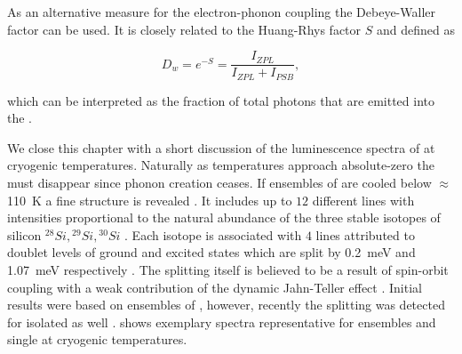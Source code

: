    As an alternative measure for the electron-phonon coupling the Debeye-Waller factor can be used. It is closely related to the Huang-Rhys factor $S$ and defined as

   \begin{equation}
     D_w = e^{-S} = \frac{I_{ZPL}}{I_{ZPL} + I_{PSB}},
   \end{equation}

    which can be interpreted as the fraction of total photons that are emitted into the \zpl.

    We close this chapter with a short discussion of the luminescence spectra of \sivs at cryogenic temperatures. Naturally as temperatures approach absolute-zero the \psb must disappear since phonon creation ceases. If ensembles of \sivs are cooled below $\approx$ \SI{110}{\kelvin} a fine structure is revealed \cite{neu2013low}. It includes up to $12$ different lines with intensities proportional to the natural abundance of the three stable isotopes of silicon ${}^{28}Si, {}^{29}Si, {}^{30}Si$ \cite{Clark1995}. Each isotope is associated with $4$ lines attributed to doublet levels of ground and excited states which are split by \SI{0.2}{\milli\eV} and \SI{1.07}{\milli\eV} respectively \cite{Rogers2014, Hepp2014, Clark1995}. The splitting itself is believed to be a result of spin-orbit coupling with a weak contribution of the dynamic Jahn-Teller effect \cite{Hepp2014}. Initial results were based on ensembles of \sivs, however, recently the splitting was detected for isolated \sivs as well \cite{Dietrich2014}.  shows exemplary spectra representative for ensembles and single \siv at cryogenic temperatures.

